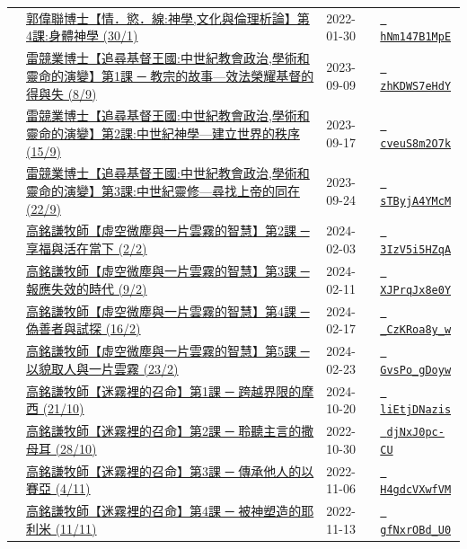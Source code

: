 \documentclass{book}
\begin{document}
{\begin{xltabular}{\textwidth}{|p{0.15\textwidth} p{0.6\textwidth}|p{0.07\textwidth} p{0.1\textwidth}|}
    & \hyperref[sec:hNm147B1MpE]{郭偉聯博士【情．慾．線:神學,文化與倫理析論】第4課:身體神學 (30/1)} & 2022-01-30 & \href{https://youtube.com/watch?v=hNm147B1MpE}{\texttt{ hNm147B1MpE}} \\
    & \hyperref[sec:zhKDWS7eHdY]{雷競業博士【追尋基督王國:中世紀教會政治,學術和靈命的演變】第1課 ─ 教宗的故事—效法榮耀基督的得與失 (8/9)} & 2023-09-09 & \href{https://youtube.com/watch?v=zhKDWS7eHdY}{\texttt{ zhKDWS7eHdY}} \\
    & \hyperref[sec:cveuS8m2O7k]{雷競業博士【追尋基督王國:中世紀教會政治,學術和靈命的演變】第2課:中世紀神學—建立世界的秩序 (15/9)} & 2023-09-17 & \href{https://youtube.com/watch?v=cveuS8m2O7k}{\texttt{ cveuS8m2O7k}} \\
    & \hyperref[sec:sTByjA4YMcM]{雷競業博士【追尋基督王國:中世紀教會政治,學術和靈命的演變】第3課:中世紀靈修—尋找上帝的同在 (22/9)} & 2023-09-24 & \href{https://youtube.com/watch?v=sTByjA4YMcM}{\texttt{ sTByjA4YMcM}} \\
    & \hyperref[sec:3IzV5i5HZqA]{高銘謙牧師【虛空微塵與一片雲霧的智慧】第2課 ─ 享福與活在當下 (2/2)} & 2024-02-03 & \href{https://youtube.com/watch?v=3IzV5i5HZqA}{\texttt{ 3IzV5i5HZqA}} \\
    & \hyperref[sec:XJPrqJx8e0Y]{高銘謙牧師【虛空微塵與一片雲霧的智慧】第3課 ─ 報應失效的時代 (9/2)} & 2024-02-11 & \href{https://youtube.com/watch?v=XJPrqJx8e0Y}{\texttt{ XJPrqJx8e0Y}} \\
    & \hyperref[sec:_CzKRoa8y_w]{高銘謙牧師【虛空微塵與一片雲霧的智慧】第4課 ─ 偽善者與試探 (16/2)} & 2024-02-17 & \href{https://youtube.com/watch?v=_CzKRoa8y_w}{\texttt{ \_CzKRoa8y\_w}} \\
    & \hyperref[sec:GvsPo_gDoyw]{高銘謙牧師【虛空微塵與一片雲霧的智慧】第5課 ─ 以貌取人與一片雲霧 (23/2)} & 2024-02-23 & \href{https://youtube.com/watch?v=GvsPo_gDoyw}{\texttt{ GvsPo\_gDoyw}} \\
    & \hyperref[sec:liEtjDNazis]{高銘謙牧師【迷霧裡的召命】第1課 ─ 跨越界限的摩西 (21/10)} & 2024-10-20 & \href{https://youtube.com/watch?v=liEtjDNazis}{\texttt{ liEtjDNazis}} \\
    & \hyperref[sec:djNxJ0pc_CU]{高銘謙牧師【迷霧裡的召命】第2課 ─ 聆聽主言的撒母耳 (28/10)} & 2022-10-30 & \href{https://youtube.com/watch?v=djNxJ0pc-CU}{\texttt{ djNxJ0pc-CU}} \\
    & \hyperref[sec:H4gdcVXwfVM]{高銘謙牧師【迷霧裡的召命】第3課 ─ 傳承他人的以賽亞 (4/11)} & 2022-11-06 & \href{https://youtube.com/watch?v=H4gdcVXwfVM}{\texttt{ H4gdcVXwfVM}} \\
    & \hyperref[sec:gfNxrOBd_U0]{高銘謙牧師【迷霧裡的召命】第4課 ─ 被神塑造的耶利米 (11/11)} & 2022-11-13 & \href{https://youtube.com/watch?v=gfNxrOBd_U0}{\texttt{ gfNxrOBd\_U0}} \\

\end{xltabular}}
\end{document}
